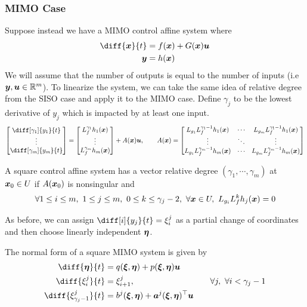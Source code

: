 \subsubsection{MIMO Case}
Suppose instead we have a MIMO control affine system where \[
	\begin{aligned}
		\diff{\bs{x}}{t} &= f(\bs{x}) + G(\bs{x})\bs{u}\\
		\bs{y} &= h(\bs{x})
	\end{aligned}
\]
We will assume that the number of outputs is equal to the number of inputs (i.e
$\boldsymbol{y}, \boldsymbol{u} \in \mathbb{R}^m$). To linearize the system, we can take the same idea
of relative degree from the SISO case and apply it to the MIMO case.
Define $\gamma_j$ to be the lowest derivative of $y_j$ which is impacted by at
least one input.\[
	\begin{bmatrix}
		\diff[\gamma_1]{y_1}{t}\\
		\vdots\\
		\diff[\gamma_m]{y_m}{t}
	\end{bmatrix}
	= \begin{bmatrix}
		L_f^{\gamma_1}h_1(\bs{x})\\
		\vdots\\
		L_f^{\gamma_m}h_m(\bs{x})\\
	\end{bmatrix} + A(\bs{x})\bs{u}, \qquad A(\bs{x}) = \begin{bmatrix}
		L_{g_1}L_f^{\gamma_1-1}h_1(\bs{x}) & \cdots &
		L_{g_m}L_f^{\gamma_1-1}h_1(\bs{x})\\
		\vdots & \ddots & \vdots\\
		L_{g_1}L_f^{\gamma_m-1}h_m(\bs{x}) & \cdots &
		L_{g_m}L_f^{\gamma_m-1}h_m(\bs{x})
	\end{bmatrix}
\]
\begin{definition}
	A square control affine system has a vector relative degree $(\gamma_1,
	\cdots, \gamma_m)$ at $\boldsymbol{x}_0\in U$ if $A(\boldsymbol{x}_0)$ is nonsingular and \[
		\forall 1\leq i\leq m,\ 1\leq j \leq m,\ 0 \leq k \leq \gamma_j-2,\ \forall
		\boldsymbol{x}\in U,\ L_{g_i}L_f^kh_j(\boldsymbol{x}) = 0
	\]
	\label{thm:vector-relative-degree}
\end{definition}
As before, we can assign $\diff[i]{y_j}{t} = \xi_i^j$ as a partial change of
coordinates and then choose linearly independent $\boldsymbol{\eta}$.
\begin{definition}
	The normal form of a square MIMO system is given by
	\[
		\begin{aligned}
			\diff{\bs{\eta}}{t} &= q(\bs{\xi},\bs{\eta}) + p(\bs{\xi}, \bs{\eta})\bs{u}\\
			\diff{\xi_i^j}{t} &= \xi_{i+1}^j, &\quad \forall j,\ \forall i < \gamma_j-1\\
			\diff{\xi_{\gamma_j-1}^j}{t} &= b^j(\bs{\xi},\bs{\eta}) +
			\bs{a}^j(\bs{\xi},\bs{\eta})^\top\bs{u}
		\end{aligned}
	\]
	\label{defn:mimo-normal-form}
\end{definition}
